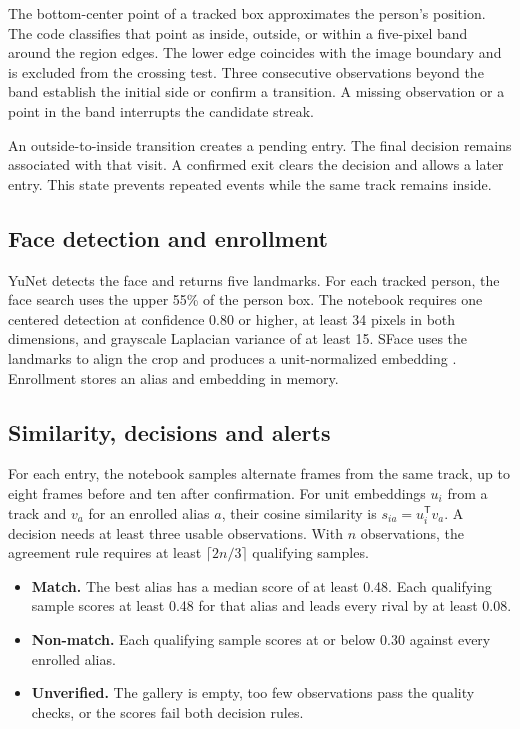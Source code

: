 \documentclass[11pt,a4paper]{article}
\begin{document}
The bottom-center point of a tracked box approximates the person's position. The code classifies that point as inside, outside, or within a five-pixel band around the region edges. The lower edge coincides with the image boundary and is excluded from the crossing test. Three consecutive observations beyond the band establish the initial side or confirm a transition. A missing observation or a point in the band interrupts the candidate streak.

An outside-to-inside transition creates a pending entry. The final decision remains associated with that visit. A confirmed exit clears the decision and allows a later entry. This state prevents repeated events while the same track remains inside.

\subsection{Face detection and enrollment}

YuNet detects the face and returns five landmarks. For each tracked person, the face search uses the upper 55\% of the person box. The notebook requires one centered detection at confidence 0.80 or higher, at least 34 pixels in both dimensions, and grayscale Laplacian variance of at least 15. SFace uses the landmarks to align the crop and produces a unit-normalized embedding \cite{opencv}. Enrollment stores an alias and embedding in memory.

\clearpage
\subsection{Similarity, decisions and alerts}

For each entry, the notebook samples alternate frames from the same track, up to eight frames before and ten after confirmation. For unit embeddings \(u_i\) from a track and \(v_a\) for an enrolled alias \(a\), their cosine similarity is \(s_{ia}=u_i^\mathsf{T}v_a\). A decision needs at least three usable observations. With \(n\) observations, the agreement rule requires at least \(\lceil 2n/3\rceil\) qualifying samples.

\begin{itemize}
  \item \textbf{Match.} The best alias has a median score of at least 0.48. Each qualifying sample scores at least 0.48 for that alias and leads every rival by at least 0.08.
  \item \textbf{Non-match.} Each qualifying sample scores at or below 0.30 against every enrolled alias.
  \item \textbf{Unverified.} The gallery is empty, too few observations pass the quality checks, or the scores fail both decision rules.
\end{itemize}
\end{document}
